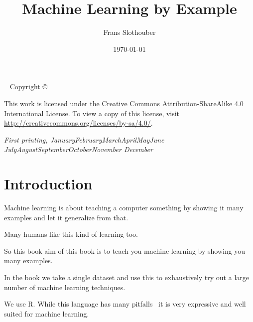 \documentclass[11pt,a4paper,oldtoc,final]{tufte-book}
\title{Machine Learning by Example}
\author{Frans Slothouber}
\date{\today}
\newcommand{\blankpage}{\newpage\hbox{}\thispagestyle{empty}\newpage}
\newcommand{\monthyear}{%
  \ifcase\month\or January\or February\or March\or April\or May\or June\or
  July\or August\or September\or October\or November\or
  December\fi\space\number\year
}
\begin{document}
\frontmatter
\blankpage

\maketitle

\newpage
\begin{fullwidth}
~\vfill
\thispagestyle{empty}
\setlength{\parindent}{0pt}
\setlength{\parskip}{\baselineskip}
Copyright \copyright\ \the\year\ \thanklessauthor

\par{}


\par This work is licensed under the Creative Commons Attribution-ShareAlike
4.0 International License. To view a copy of this license, visit
\url{http://creativecommons.org/licenses/by-sa/4.0/}. 

\par\textit{First printing, \monthyear}
\end{fullwidth}

\tableofcontents

\listoffigures

\listoftables




\chapter*{Introduction}

Machine learning is about teaching a computer something
by showing it many examples and let it generalize from that.

Many humans like this kind of learning too.

So this book aim of this book is to teach you machine learning
by showing you many examples.

In the book we take a single dataset and use this to 
exhaustively try out a large number of machine learning techniques.

We use R.
While this language has many pitfalls~\cite{Burns2011}
it is very expressive and well suited for machine learning.

\mainmatter
\end{document}
